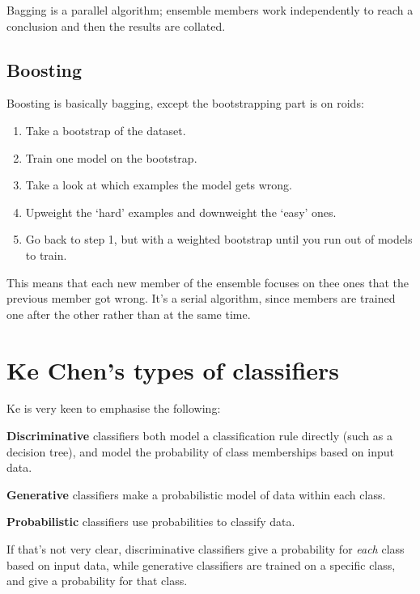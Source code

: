 Bagging is a parallel algorithm; ensemble members work independently to reach a
conclusion and then the results are collated.

\subsection{Boosting}

Boosting is basically bagging, except the bootstrapping part is on roids:

\begin{enumerate}
  \item Take a bootstrap of the dataset.
  \item Train one model on the bootstrap.
  \item Take a look at which examples the model gets wrong.
  \item Upweight the `hard' examples and downweight the `easy' ones.
  \item Go back to step 1, but with a weighted bootstrap until you run out of
    models to train.
\end{enumerate}

This means that each new member of the ensemble focuses on thee ones that the
previous member got wrong. It's a serial algorithm, since members are trained
one after the other rather than at the same time.

\section{Ke Chen's types of classifiers}

Ke is very keen to emphasise the following:

\begin{description}
  \item \textbf{Discriminative} classifiers both model a classification rule
    directly (such as a decision tree), and model the probability of class
    memberships based on input data.
  \item \textbf{Generative} classifiers make a probabilistic model of data
    within each class.
  \item \textbf{Probabilistic} classifiers use probabilities to classify data.
\end{description}

If that's not very clear, discriminative classifiers give a probability for
\textit{each} class based on input data, while generative classifiers are
trained on a specific class, and give a probability for that class.

